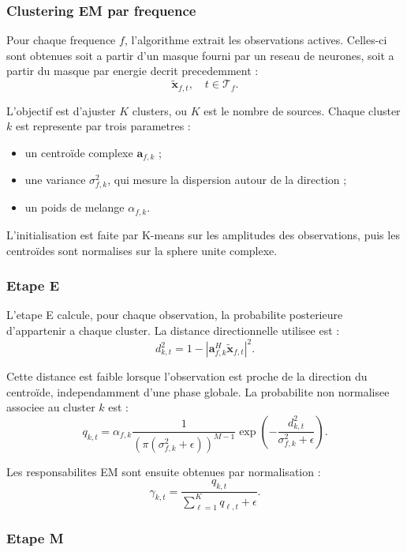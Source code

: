 \documentclass[11pt,a4paper]{article}
\begin{document}
\subsubsection{Clustering EM par frequence}

Pour chaque frequence $f$, l'algorithme extrait les observations actives. Celles-ci
sont obtenues soit a partir d'un masque fourni par un reseau de neurones, soit a
partir du masque par energie decrit precedemment :
\[
  \tilde{\mathbf{x}}_{f,t}, \quad t \in \mathcal{T}_f.
  \]
  
  L'objectif est d'ajuster $K$ clusters, ou $K$ est le nombre de sources. Chaque
  cluster $k$ est represente par trois parametres :
  
  \begin{itemize}
    \item un centroïde complexe $\mathbf{a}_{f,k}$ ;
    \item une variance $\sigma^2_{f,k}$, qui mesure la dispersion autour de la
    direction ;
    \item un poids de melange $\alpha_{f,k}$.
  \end{itemize}
  
  L'initialisation est faite par K-means sur les amplitudes des observations, puis
  les centroïdes sont normalises sur la sphere unite complexe.
  
  \subsubsection{Etape E}
  
  L'etape E calcule, pour chaque observation, la probabilite posterieure
  d'appartenir a chaque cluster. La distance directionnelle utilisee est :
  \[
    d^2_{k,t}
    =
    1 -
    \left|
    \mathbf{a}_{f,k}^{H}
    \tilde{\mathbf{x}}_{f,t}
    \right|^2.
\]

Cette distance est faible lorsque l'observation est proche de la direction du
centroïde, independamment d'une phase globale. La probabilite non normalisee
associee au cluster $k$ est :
\[
  q_{k,t}
    =
    \alpha_{f,k}
    \frac{1}
         {\left(\pi(\sigma^2_{f,k}+\epsilon)\right)^{M-1}}
    \exp\left(
      -\frac{d^2_{k,t}}{\sigma^2_{f,k}+\epsilon}
    \right).
\]

Les responsabilites EM sont ensuite obtenues par normalisation :
\[
  \gamma_{k,t}
    =
    \frac{q_{k,t}}
         {\sum_{\ell=1}^{K} q_{\ell,t}+\epsilon}.
\]

\subsubsection{Etape M}
\end{document}
